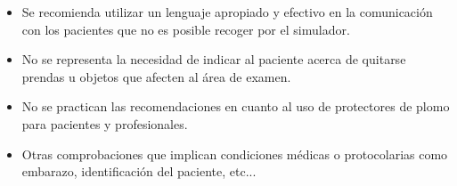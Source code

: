 \begin{itemize}
    \item Se recomienda utilizar un lenguaje apropiado y efectivo en la comunicación con los pacientes que no es posible recoger por el simulador.
    \item No se representa la necesidad de indicar al paciente acerca de quitarse prendas u objetos que afecten al área de examen.
    \item No se practican las recomendaciones en cuanto al uso de protectores de plomo para pacientes y profesionales.
    \item Otras comprobaciones que implican condiciones médicas o protocolarias como embarazo, identificación del paciente, etc...
\end{itemize}
